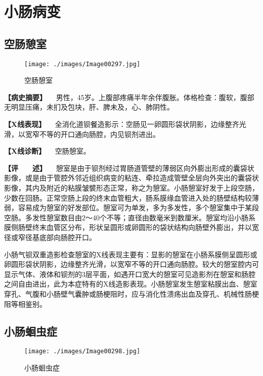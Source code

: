 \section{小肠病变}

\subsection{空肠憩室}

\begin{figure}[!htbp]
 \centering
 \texttt{[image: ./images/Image00297.jpg]}
 \captionsetup{justification=centering}
 \caption{空肠憩室}
 \label{fig5-5-1}
  \end{figure} 

\textbf{【病史摘要】}
　男性，45岁。上腹部疼痛半年余伴腹胀。体格检查：腹软，腹部无明显压痛，未扪及包块，肝、脾未及，心、肺阴性。

\textbf{【X线表现】}
　全消化道钡餐造影示：空肠见一卵圆形袋状阴影，边缘整齐光滑，以宽窄不等的开口通向肠腔，内见钡剂进出。

\textbf{【X线诊断】} 　空肠憩室。

\textbf{【评　　述】}
　憩室是由于钡剂经过胃肠道管壁的薄弱区向外膨出形成的囊袋状影像，或是由于管腔外邻近组织病变的粘连、牵拉造成管壁全层向外突出的囊袋状影像，其内及附近的粘膜皱襞形态正常，称之为憩室。小肠憩室好发于上段空肠，少数在回肠。正常空肠上段的终末血管粗大，肠系膜缘血管进入处的肠壁结构较薄弱，容易成为憩室的好发部位。憩室可为单发，多为多发性，多个憩室集中于某段空肠。多发性憩室数目由2～40个不等；直径由数毫米到数厘米。憩室均沿小肠系膜侧肠壁终末血管区分布，形状呈圆形或卵圆形的袋状结构向肠壁外膨出，并以宽径或窄径基底部向肠腔开口。

小肠气钡双重造影检查憩室的X线表现主要有：显影的憩室在小肠系膜侧呈圆形或卵圆形袋状阴影，边缘整齐光滑，以宽窄不等的开口通向肠腔。较大的憩室腔内可显示气体、液体和钡剂的3层平面，如遇开口宽大的憩室可见造影剂在憩室和肠腔之间自由进出，此为本症特有的X线造影表现。小肠憩室发生憩室粘膜出血、憩室穿孔、气腹和小肠壁气囊肿或肠梗阻时，应与消化性溃疡出血及穿孔、机械性肠梗阻等相鉴别。

\subsection{小肠蛔虫症}

\begin{figure}[!htbp]
 \centering
 \texttt{[image: ./images/Image00298.jpg]}
 \captionsetup{justification=centering}
 \caption{小肠蛔虫症}
 \label{fig5-5-2}
  \end{figure} 

